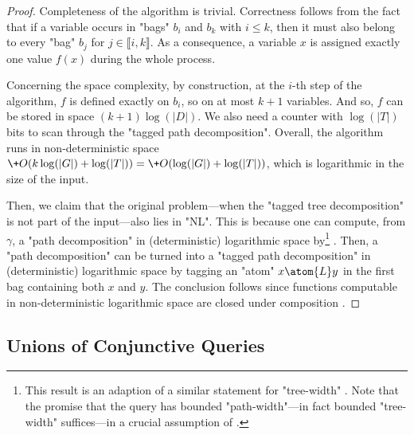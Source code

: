 \begin{proof}
	Completeness of the algorithm is trivial. Correctness follows from the fact that if
	a variable occurs in "bags" $b_i$ and $b_k$ with $i \leq k$, then it must also belong to every
	"bag" $b_j$ for $j \in \lBrack i,k \rBrack$. As a consequence, a variable $x$ is assigned 
	exactly one value $f(x)$ during the whole process. 

	Concerning the space complexity,
	by construction, at the $i$-th step of the algorithm, $f$ is defined exactly on $b_i$, so on at most $k+1$ variables.
	And so, $f$ can be stored in space $(k+1)\log(|D|)$.
	We also need a counter with $\log(|T|)$ bits to scan through the "tagged path decomposition".
	Overall, the algorithm runs in non-deterministic space
	$\+O(k\log(|G|) + \log(|T|)) = \+O(\log(|G|) + \log(|T|))$,
	which is logarithmic in the size of the input.

	Then, we claim that the original problem---when the "tagged tree decomposition" is not part of 
	the input---also lies in "NL". This is because one can compute, from $\gamma$, a
	"path decomposition" in (deterministic) logarithmic space by\footnote{This result is an 
	adaption of a similar statement for "tree-width" \cite[Theorem I.1, p. 143]{ElberfeldJakobyTantau2010Logspace}. Note that the promise that the query has bounded "path-width"---in fact bounded "tree-width" suffices---in a crucial assumption of  \cite[Theorem I.1, p. 143]{ElberfeldJakobyTantau2010Logspace}.} 
	\cite[Theorem 1.3, p. 2]{KintaliMunteanu2010Computing}. Then, a "path decomposition" can be turned into a 
	"tagged path decomposition" in (deterministic) logarithmic space by tagging an "atom"
	$x \atom{L} y$ in the first bag containing both $x$ and $y$.
	The conclusion follows since functions computable in non-deterministic logarithmic space
	are closed under composition \cite[Lemma 4.17, p. 88]{AroraBarak2009ComputationalComplexity}. 
\end{proof}

\subsection{Unions of Conjunctive Queries}
\label{sec:prelim-db-ucq}

